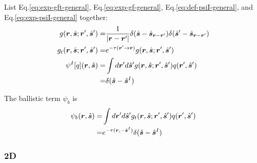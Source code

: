 \documentclass [10pt,letterpaper]{article}
\newcommand{\unitvectorsym}[1]{\hat{\vectorsym{#1}}}
\begin{document}
List Eq.\eqref{eq:exp-gft-general}, Eq.\eqref{eq:exp-gf-general}, Eq.\eqref{eq:def-psiI-general}, and Eq.\eqref{eq:exp-psiI-general} together:
\begin{subequations} \label{eq:der-psib-1}
	\begin{align}
		g(\vectorsym{r},\unitvectorsym{s};\vectorsym{r}^\prime,\unitvectorsym{s}^\prime)
		=&
		\frac
		{1}
		{\lvert \vectorsym{r}-\vectorsym{r}^\prime \rvert}
		\delta(\unitvectorsym{s}-\unitvectorsym{s}_{\vectorsym{r}-\vectorsym{r}^\prime})
		\delta(\unitvectorsym{s}^\prime-\unitvectorsym{s}_{\vectorsym{r}-\vectorsym{r}^\prime})
		\\
		g_t(\vectorsym{r},\unitvectorsym{s};\vectorsym{r}^\prime,\unitvectorsym{s}^\prime)
		=&
		{e^{-\tau(\vectorsym{r}^\prime\to\vectorsym{r})}}
		g(\vectorsym{r},\unitvectorsym{s};\vectorsym{r}^\prime,\unitvectorsym{s}^\prime) 
		\\ 
   		\psi^I[q](\vectorsym{r},\unitvectorsym{s})
		=&
   		\int d\vectorsym{r}^\prime d\unitvectorsym{s}^\prime
   		g(\vectorsym{r},\unitvectorsym{s};\vectorsym{r}^\prime,\unitvectorsym{s}^\prime)
   		q(\vectorsym{r}^\prime,\unitvectorsym{s}^\prime)
		\\
		=&
		\delta
		(\unitvectorsym{s}-\unitvectorsym{s}^I)
	\end{align}
\end{subequations}

The ballistic term $\psi_b$ is
\begin{equation} \label{eq:result-psib-general}
	\begin{split}
		\psi_b(\vectorsym{r},\unitvectorsym{s})
		=&
		\int d\vectorsym{r}^\prime d\unitvectorsym{s}^\prime
		g_t(\vectorsym{r},\unitvectorsym{s};\vectorsym{r}^\prime,\unitvectorsym{s}^\prime) 
		q(\vectorsym{r}^\prime,\unitvectorsym{s}^\prime)
		\\
		=&
		e^{-\tau(\vectorsym{r},-\unitvectorsym{s}^I)}
		\delta(\unitvectorsym{s}-\unitvectorsym{s}^I)
	\end{split}
\end{equation}

\subsubsection{2D}
\label{subsub:extracting-psib-2d}
\end{document}
